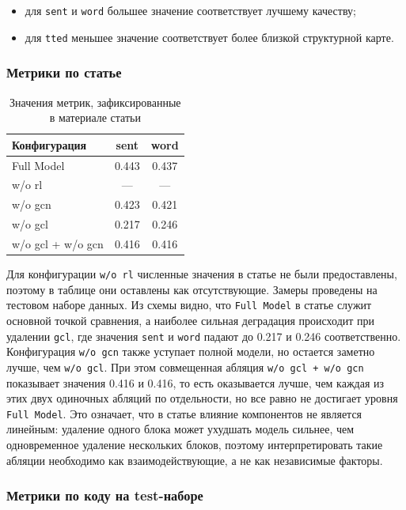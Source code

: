 \documentclass[12pt,a4paper]{article}
\begin{document}
\begin{itemize}
    \item для \texttt{sent} и \texttt{word} большее значение соответствует лучшему
    качеству;
    \item для \texttt{tted} меньшее значение соответствует более близкой структурной карте.
\end{itemize}

\subsubsection{Метрики по статье}

\begin{table}[H]
\centering
\caption{Значения метрик, зафиксированные в материале статьи}
\begin{tabular}{lcc}
\toprule
Конфигурация & sent & word \\
\midrule
Full Model & 0.443 & 0.437 \\
w/o rl & --- & --- \\
w/o gcn & 0.423 & 0.421 \\
w/o gcl & 0.217 & 0.246 \\
w/o gcl + w/o gcn & 0.416 & 0.416 \\
\bottomrule
\end{tabular}
\end{table}

Для конфигурации \texttt{w/o rl} численные значения в статье не были предоставлены, поэтому в
таблице они оставлены как отсутствующие. Замеры проведены на тестовом наборе данных. Из схемы видно, что \texttt{Full Model} в статье служит основной точкой
сравнения, а наиболее сильная деградация происходит при удалении \texttt{gcl}, где
значения \texttt{sent} и \texttt{word} падают до 0.217 и 0.246 соответственно.
Конфигурация \texttt{w/o gcn} также уступает полной модели, но остается заметно лучше,
чем \texttt{w/o gcl}. При этом совмещенная абляция \texttt{w/o gcl + w/o gcn}
показывает значения 0.416 и 0.416, то есть оказывается лучше, чем каждая из этих
двух одиночных абляций по отдельности, но все равно не достигает уровня \texttt{Full Model}.
Это означает, что в статье влияние компонентов не является линейным: удаление одного
блока может ухудшать модель сильнее, чем одновременное удаление нескольких блоков,
поэтому интерпретировать такие абляции необходимо как взаимодействующие, а не как
независимые факторы.

\subsubsection{Метрики по коду на test-наборе}
\end{document}
